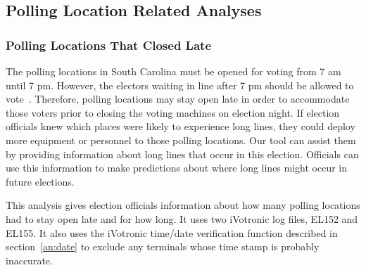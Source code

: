 \subsection{Polling Location Related Analyses}
\subsubsection{Polling Locations That Closed Late}
The polling locations in South Carolina must be opened for voting from 7 am until 7 pm. However, the electors waiting in line after 7 pm should be allowed to vote~\cite{VotingInfo}. Therefore, polling locations may stay open late in order to accommodate those voters prior to closing the voting machines on election night.  If election officials knew which places were likely to experience long lines, they could deploy more equipment or personnel to those polling locations.  Our tool can assist them by providing information about long lines that occur in this election.  Officials can use this information to make predictions about where long lines might occur in future elections.  

This analysis gives election officials information about how many polling locations had to stay open late and for how long.  It uses two iVotronic log files, EL152 and EL155. It also uses the iVotronic time/date verification function described in section~\ref{an:date} to exclude any terminals whose time stamp is probably inaccurate.  

